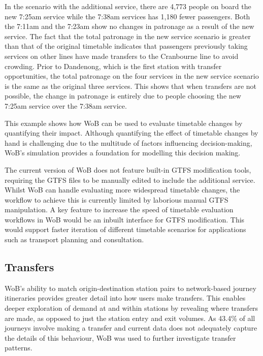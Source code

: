 In the scenario with the additional service, there are 4,773 people on board the new 7:25am service while the 7:38am services has 1,180 fewer passengers. Both the 7:11am and the 7:23am show no changes in patronage as a result of the new service. The fact that the total patronage in the new service scenario is greater than that of the original timetable indicates that passengers previously taking services on other lines have made transfers to the Cranbourne line to avoid crowding. Prior to Dandenong, which is the first station with transfer opportunities, the total patronage on the four services in the new service scenario is the same as the original three services. This shows that when transfers are not possible, the change in patronage is entirely due to people choosing the new 7:25am service over the 7:38am service. 

This example shows how WoB can be used to evaluate timetable changes by quantifying their impact. Although quantifying the effect of timetable changes by hand is challenging due to the multitude of factors influencing decision-making, WoB's simulation provides a foundation for modelling this decision making.

The current version of WoB does not feature built-in GTFS modification tools, requiring the GTFS files to be manually edited to include the additional service. Whilst WoB can handle evaluating more widespread timetable changes, the workflow to achieve this is currently limited by laborious manual GTFS manipulation. A key feature to increase the speed of timetable evaluation workflows in WoB would be an inbuilt interface for GTFS modification. This would support faster iteration of different timetable scenarios for applications such as transport planning and consultation. 

\subsection{Transfers}
WoB's ability to match origin-destination station pairs to network-based journey itineraries provides greater detail into how users make transfers. This enables deeper exploration of demand at and within stations by revealing where transfers are made, as opposed to just the station entry and exit volumes. As 43.4\% of all journeys involve making a transfer and current data does not adequately capture the details of this behaviour, WoB was used to further investigate transfer patterns. 

